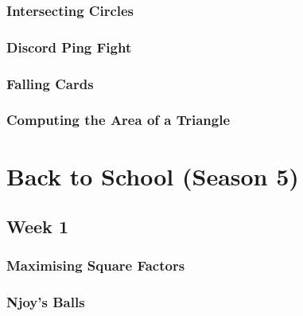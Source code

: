 \documentclass[titlepage=true]{scrartcl}
\begin{document}
        \subsubsection{Intersecting Circles}
            \label{5-2-4}
            
        \newpage

        \subsubsection{Discord Ping Fight}
            \label{5-2-5}
            
        \newpage

        \subsubsection{Falling Cards}
            \label{5-2-6}
            
        \newpage

        \subsubsection{Computing the Area of a Triangle}
            \label{5-2-7}
            
        \newpage

\section{Back to School (Season 5) }
                    
    \subsection{Week 1}

        \subsubsection{Maximising Square Factors}
            \label{6.1.1}
            
        \newpage

        \subsubsection{Njoy's Balls}
            \label{6.1.2}
            
        \newpage
\end{document}
